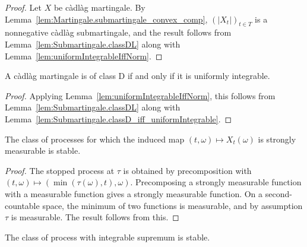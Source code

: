 \begin{proof}\leanok
Let $X$ be càdlàg martingale. By Lemma~\ref{lem:Martingale.submartingale_convex_comp}, $(|X_t|)_{t \in T}$ is a nonnegative càdlàg submartingale, and the result follows from Lemma~\ref{lem:Submartingale.classDL} along with Lemma~\ref{lem:uniformIntegrableIffNorm}.
\end{proof}


\begin{lemma}\label{lem:Martingale.classD_iff_uniformIntegrable}
  \leanok
A càdlàg martingale is of class D if and only if it is uniformly integrable.
\end{lemma}

\begin{proof}
Applying Lemma~\ref{lem:uniformIntegrableIffNorm}, this follows from Lemma~\ref{lem:Submartingale.classDL} along with Lemma~\ref{lem:Submartingale.classD_iff_uniformIntegrable}.
\end{proof}


\begin{lemma}\label{lem:isStable_stronglyMeasurable_uncurry}
  \leanok
The class of processes for which the induced map $(t,\omega)\mapsto X_t(\omega)$ is strongly measurable is stable.
\end{lemma}

\begin{proof}
The stopped process at $\tau$ is obtained by precomposition with $(t, \omega) \mapsto (\min (\tau(\omega), t), \omega)$.
Precomposing a strongly measurable function with a measurable function gives a strongly measurable function.
On a second-countable space, the minimum of two functions is measurable, and by assumption $\tau$ is measurable.
The result follows from this.
\end{proof}


\begin{lemma}\label{lem:isStable_hasIntegrableSup}
  \leanok
The class of process with integrable supremum is stable.
\end{lemma}

